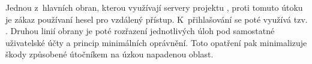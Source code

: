 Jednou z~hlavních obran, kterou využívají servery projektu \bso{}, proti tomuto útoku je zákaz používaní hesel pro vzdálený přístup.
K~přihlašování se poté využívá tzv. .
Druhou linií obrany je poté rozřazení jednotlivých úloh pod samostatné uživatelské účty a princip minimálních oprávnění.
Toto opatření pak minimalizuje škody způsobené útočníkem na úzkou napadenou oblast. 

%
%
%
%
%
